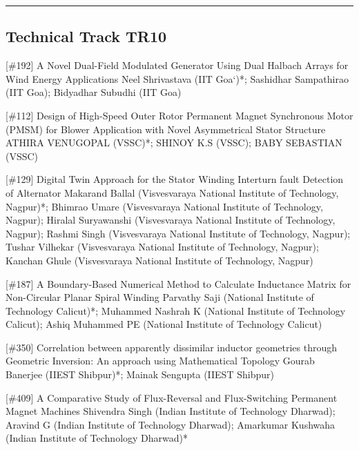 \hrule  \subsection{Technical Track TR10}\nopagebreak {} \begin{abstract_online} {[\#192] A Novel Dual-Field Modulated Generator Using Dual Halbach Arrays for Wind Energy Applications} {} {Neel Shrivastava (IIT Goa`)*; Sashidhar Sampathirao (IIT Goa); Bidyadhar Subudhi (IIT Goa)} {}  \end{abstract_online} 
{} \begin{abstract_online} {[\#112] Design of High-Speed Outer Rotor Permanent Magnet Synchronous Motor (PMSM) for Blower Application with Novel Asymmetrical Stator Structure} {} {ATHIRA VENUGOPAL (VSSC)*; SHINOY K.S (VSSC); BABY SEBASTIAN (VSSC)} {}  \end{abstract_online} 
{} \begin{abstract_online} {[\#129] Digital Twin Approach for the Stator Winding Interturn fault Detection of Alternator} {} {Makarand Ballal (Visvesvaraya National Institute of Technology, Nagpur)*; Bhimrao Umare (Visvesvaraya National Institute of Technology, Nagpur); Hiralal Suryawanshi (Visvesvaraya National Institute of Technology, Nagpur); Rashmi Singh (Visvesvaraya National Institute of Technology, Nagpur); Tushar Vilhekar (Visvesvaraya National Institute of Technology, Nagpur); Kanchan Ghule (Visvesvaraya National Institute of Technology, Nagpur)} {}  \end{abstract_online} 
{} \begin{abstract_online} {[\#187] A Boundary-Based Numerical Method to Calculate Inductance Matrix for Non-Circular Planar Spiral Winding} {} {Parvathy Saji (National Institute of Technology Calicut)*; Muhammed  Nashrah K (National Institute of Technology Calicut); Ashiq Muhammed PE (National Institute of Technology Calicut)} {}  \end{abstract_online} 
{} \begin{abstract_online} {[\#350] Correlation between apparently dissimilar inductor geometries through Geometric Inversion: An approach using Mathematical Topology} {} {Gourab Banerjee (IIEST Shibpur)*; Mainak Sengupta (IIEST Shibpur)} {}  \end{abstract_online} 
{} \begin{abstract_online} {[\#409] A Comparative Study of Flux-Reversal and Flux-Switching Permanent Magnet Machines} {} { Shivendra Singh (Indian Institute of Technology Dharwad); Aravind G (Indian Institute of Technology Dharwad); Amarkumar Kushwaha (Indian Institute of Technology Dharwad)*} {}  \end{abstract_online} 
